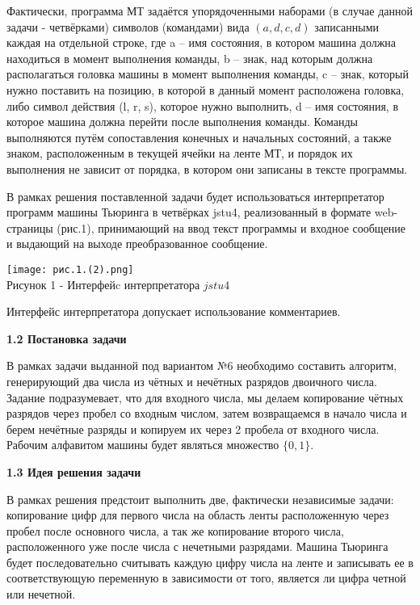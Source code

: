 \documentclass{article}
\begin{document}
\vspace{0.2cm}
Фактически, программа МТ задаётся упорядоченными наборами (в случае данной задачи - четвёрками) символов (командами) вида $(a,d,c,d)$ записанными каждая на отдельной строке, где a – имя состояния, в котором машина должна находиться в момент выполнения команды, b – знак, над которым должна располагаться головка машины в момент выполнения команды, c – знак, который нужно поставить на позицию, в которой в данный момент расположена головка, либо символ действия (l, r, s), которое нужно выполнить, d – имя состояния, в которое машина должна перейти после выполнения команды. Команды выполняются путём сопоставления конечных и начальных состояний, а также знаком, расположенным в текущей ячейки на ленте МТ, и порядок их выполнения не зависит от порядка, в котором они записаны в тексте программы.\\

\par В рамках решения поставленной задачи будет использоваться интерпретатор программ машины Тьюринга в четвёрках jstu4, реализованный в формате web-страницы (рис.1), принимающий на ввод текст программы и входное сообщение и выдающий на выходе преобразованное сообщение.

\begin{center}
    \texttt{[image: рис.1.(2).png]}\\
    \small{Рисунок 1 -  Интерфейc интерпретатора $jstu4$}
\end{center}

\noindent Интерфейс интерпретатора допускает использование комментариев.

\vspace{5cm}

\par\textbf{1.2 Постановка задачи}\\
\par В рамках задачи выданной под вариантом №6 необходимо составить алгоритм, генерирующий два числа из чётных и нечётных разрядов двоичного числа. Задание подразумевает, что для входного числа, мы делаем копирование чётных разрядов через пробел со входным числом, затем возвращаемся в начало числа и берем нечётные разряды и копируем их через 2 пробела от входного числа. Рабочим алфавитом машины будет являться множество $\big\{ 0,1 \big\}$.\\

\par\textbf{1.3 Идея решения задачи}\\
\par В рамках решения предстоит выполнить две, фактически независимые задачи: копирование цифр для первого числа на область ленты расположенную через пробел после основного числа, а так же копирование второго числа, расположенного уже после числа с нечетными разрядами. Машина Тьюринга будет последовательно считывать каждую цифру числа на ленте и записывать ее в соответствующую переменную в зависимости от того, является ли цифра четной или нечетной.\\
\end{document}

